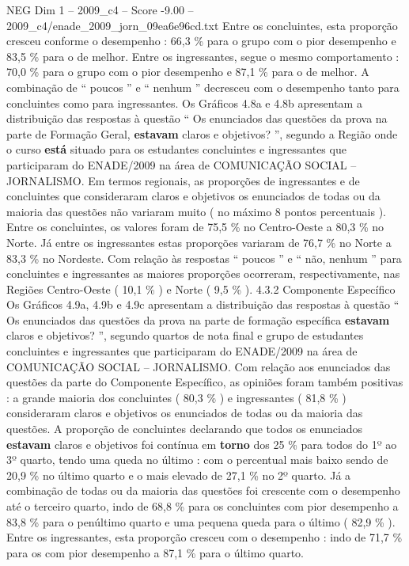 \begin{textsample}{NEG Dim 1 – 2009\_c4 – Score -9.00 – 2009\_c4/enade\_2009\_jorn\_09ea6e96cd.txt}
Entre os concluintes, esta proporção cresceu conforme o desempenho : 66,3 \% para o grupo com o pior desempenho e 83,5 \% para o de melhor.
Entre os ingressantes, segue o mesmo comportamento : 70,0 \% para o grupo com o pior desempenho e 87,1 \% para o de melhor.
A combinação de “ poucos ” e “ nenhum ” decresceu com o desempenho tanto para concluintes como para ingressantes.
Os Gráficos 4.8a e 4.8b apresentam a distribuição das respostas à questão “ Os enunciados das questões da prova na parte de Formação Geral, \textbf{estavam} claros e objetivos? ”, segundo a Região onde o curso \textbf{está} situado para os estudantes concluintes e ingressantes que participaram do ENADE/2009 na área de COMUNICAÇÃO SOCIAL – JORNALISMO.
Em termos regionais, as proporções de ingressantes e de concluintes que consideraram claros e objetivos os enunciados de todas ou da maioria das questões não variaram muito ( no máximo 8 pontos percentuais ).
Entre os concluintes, os valores foram de 75,5 \% no Centro-Oeste a 80,3 \% no Norte.
Já entre os ingressantes estas proporções variaram de 76,7 \% no Norte a 83,3 \% no Nordeste.
Com relação às respostas “ poucos ” e “ não, nenhum ” para concluintes e ingressantes as maiores proporções ocorreram, respectivamente, nas Regiões Centro-Oeste ( 10,1 \% ) e Norte ( 9,5 \% ). 4.3.2 Componente Específico Os Gráficos 4.9a, 4.9b e 4.9c apresentam a distribuição das respostas à questão “ Os enunciados das questões da prova na parte de formação específica \textbf{estavam} claros e objetivos? ”, segundo quartos de nota final e grupo de estudantes concluintes e ingressantes que participaram do ENADE/2009 na área de COMUNICAÇÃO SOCIAL – JORNALISMO.
Com relação aos enunciados das questões da parte do Componente Específico, as opiniões foram também positivas : a grande maioria dos concluintes ( 80,3 \% ) e ingressantes ( 81,8 \% ) consideraram claros e objetivos os enunciados de todas ou da maioria das questões.
A proporção de concluintes declarando que todos os enunciados \textbf{estavam} claros e objetivos foi contínua em \textbf{torno} dos 25 \% para todos do 1º ao 3º quarto, tendo uma queda no último : com o percentual mais baixo sendo de 20,9 \% no último quarto e o mais elevado de 27,1 \% no 2º quarto.
Já a combinação de todas ou da maioria das questões foi crescente com o desempenho até o terceiro quarto, indo de 68,8 \% para os concluintes com pior desempenho a 83,8 \% para o penúltimo quarto e uma pequena queda para o último ( 82,9 \% ).
Entre os ingressantes, esta proporção cresceu com o desempenho : indo de 71,7 \% para os com pior desempenho a 87,1 \% para o último quarto.

\end{textsample}

